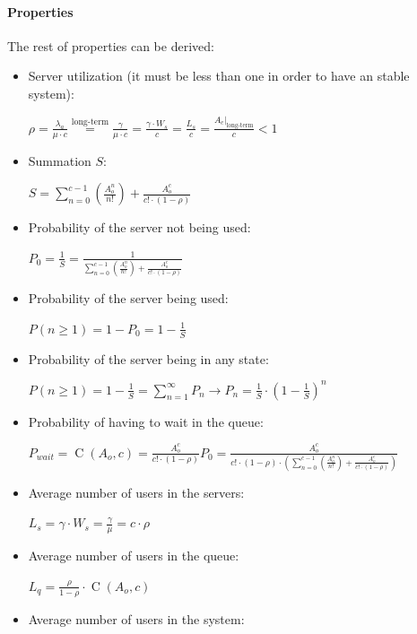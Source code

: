 \documentclass[../main.tex]{subfiles}
\begin{document}
\paragraph{Properties}

The rest of properties can be derived:

\begin{itemize}
	\item {
		Server utilization (it must be less than one in order to have an stable system):

		$
			\rho =
			\frac {\lambda_a} {\mu \cdot c} \overset {\textrm{long-term}} {=}
			\frac {\gamma} {\mu \cdot c} =
			\frac {\gamma \cdot W_s} {c} =
			\frac {L_s} {c} =
			\frac {\left. A_c \right|_{\textrm{long-term}}} {c}
			< 1
		$
	}
	\item {
		Summation $S$:

		$
			S =
			\sum_{n=0}^{c-1} \left( \frac {A_{o}^n} {n!} \right) + \frac {A_{o}^c} {c! \cdot (1-\rho)}
		$
	}
	\item {
		Probability of the server not being used:

		$
			P_0 = \frac {1} {S} = \frac {1} {\sum_{n=0}^{c-1} \left( \frac {A_{o}^n} {n!} \right) + \frac {A_{o}^c} {c! \cdot (1-\rho)}}
		$
	}
	\item {
		Probability of the server being used:

		$
			P(n \geq 1) = 1 - P_0 = 1 - \frac {1} {S}
		$
	}
	\item {
		Probability of the server being in any state:

		$
			P(n \geq 1) = 1 - \frac {1} {S} = \sum_{n=1}^{\infty} P_n \rightarrow
			P_n = \frac {1} {S} \cdot \left( 1 - \frac {1} {S} \right)^n
		$
	}
	\item {
		Probability of having to wait in the queue:

		$
			P_{wait} = \operatorname{C}(A_o, c) = \frac {A_{o}^c} {c! \cdot (1-\rho)} P_0 =  \frac {A_{o}^c} { c! \cdot (1-\rho) \cdot \left( \sum_{n=0}^{c-1} \left( \frac {A_{o}^n} {n!} \right) + \frac {A_{o}^c} {c! \cdot (1-\rho)} \right) }
		$
	}
	\item {
		Average number of users in the servers:

		$
			L_s = \gamma \cdot W_s = \frac {\gamma} {\mu} = c \cdot \rho
		$
	}
	\item {
		Average number of users in the queue:

		$
			L_q = \frac {\rho} {1-\rho} \cdot \operatorname{C}(A_o, c)
		$
	}
	\item {
		Average number of users in the system:

}
\end{itemize}
\end{document}
